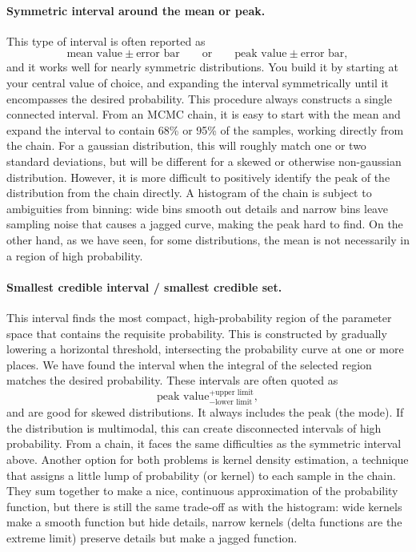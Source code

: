 \paragraph{Symmetric interval around the mean or peak.}  This type of interval is often reported as
$$\mbox{mean value} \pm \mbox{error bar} \qquad \mbox{or} \qquad \mbox{peak value} \pm \mbox{error bar},$$
  and it works well for nearly symmetric distributions.  You build it by starting at your central value of choice, and expanding the interval symmetrically until it encompasses the desired probability.  This procedure always constructs a single connected interval.  From an MCMC chain, it is easy to start with the mean and expand the interval to contain 68\% or 95\% of the samples, working directly from the chain.  For a gaussian distribution, this will roughly match one or two standard deviations, but will be different for a skewed or otherwise non-gaussian distribution.  However, it is more difficult to positively identify the peak of the distribution from the chain directly.  A histogram of the chain is subject to ambiguities from binning: wide bins smooth out details and narrow bins leave sampling noise that causes a jagged curve, making the peak hard to find.  On the other hand, as we have seen, for some distributions, the mean is not necessarily in a region of high probability.
\paragraph{Smallest credible interval / smallest credible set.}  This interval finds the most compact, high-probability region of the parameter space that contains the requisite probability.  This is constructed by gradually lowering a horizontal threshold, intersecting the probability curve at one or more places.  We have found the interval when the integral of the selected region matches the desired probability.   These intervals are often quoted as
  $$\mbox{peak value}^{+\textrm{upper\ limit}}_{-\textrm{lower\ limit}},$$
  and are good for skewed distributions.  It always includes the peak (the mode).
  If the distribution is multimodal, this can create disconnected intervals of high probability.  From a chain, it faces the same difficulties as the symmetric interval above.  Another option for both problems is kernel density estimation, a technique that assigns a little lump of probability (or kernel) to each sample in the chain. They sum together to make a nice, continuous approximation of the probability function, but there is still the same trade-off as with the histogram: wide kernels make a smooth function but hide details, narrow kernels (delta functions are the extreme limit) preserve details but make a jagged function.

